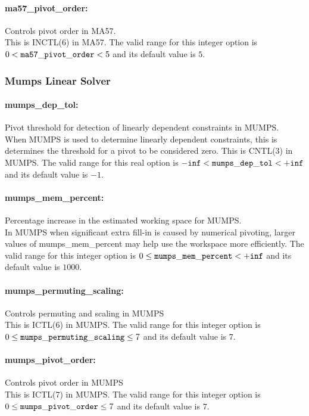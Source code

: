 \paragraph{ma57\_pivot\_order:}\label{sec:ma57_pivot_order} Controls pivot order in MA57. $\;$ \\
This is INCTL(6) in MA57.
The valid range for this integer option is 
$0 <  {\tt ma57\_pivot\_order } <  5$
and its default value is $5$.

\subsubsection{Mumps Linear Solver}
\label{sec:Mumps_Linear_Solver}

\paragraph{mumps\_dep\_tol:}\label{sec:mumps_dep_tol} Pivot threshold for detection of linearly dependent constraints in MUMPS. $\;$ \\
 When MUMPS is used to determine linearly
dependent constraints, this is determines the
threshold for a pivot to be considered zero. 
This is CNTL(3) in MUMPS. The valid range for this real option is 
${\tt -inf} <  {\tt mumps\_dep\_tol } <  {\tt +inf}$
and its default value is $-1$.


\paragraph{mumps\_mem\_percent:}\label{sec:mumps_mem_percent} Percentage increase in the estimated working space for MUMPS. $\;$ \\
 In MUMPS when significant extra fill-in is caused
by numerical pivoting, larger values of
mumps\_mem\_percent may help use the workspace
more efficiently. The valid range for this integer option is
$0 \le {\tt mumps\_mem\_percent } <  {\tt +inf}$
and its default value is $1000$.


\paragraph{mumps\_permuting\_scaling:}\label{sec:mumps_permuting_scaling} Controls permuting and scaling in MUMPS $\;$ \\
 This is ICTL(6) in MUMPS. The valid range for this integer option is
$0 \le {\tt mumps\_permuting\_scaling } \le 7$
and its default value is $7$.


\paragraph{mumps\_pivot\_order:}\label{sec:mumps_pivot_order} Controls pivot order in MUMPS $\;$ \\
 This is ICTL(7) in MUMPS. The valid range for this integer option is
$0 \le {\tt mumps\_pivot\_order } \le 7$
and its default value is $7$.


